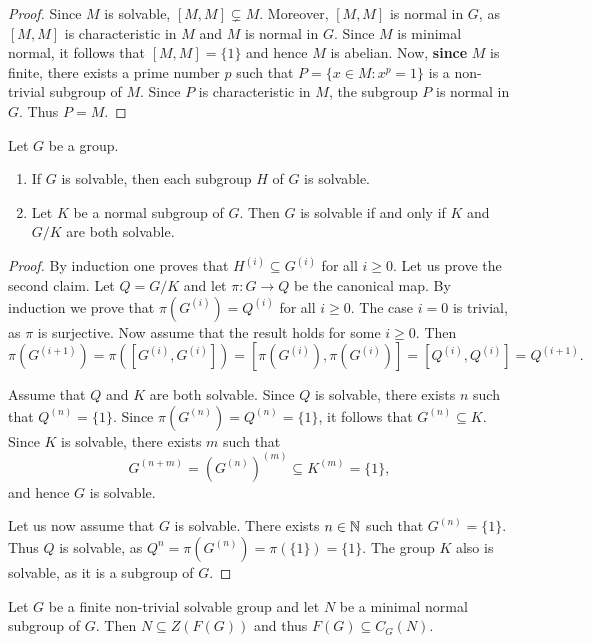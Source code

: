 \begin{proof}
	Since $M$ is solvable, $[M,M]\subsetneq M$. Moreover, $[M,M]$ is normal in $G$, as 
    $[M,M]$ is characteristic in $M$ and $M$ is normal in $G$. Since $M$ is minimal normal, 
    it follows that $[M,M]=\{1\}$ and hence $M$ is abelian. 
	Now, {\bf since} $M$ is finite, there exists a prime number $p$ such that 
	$P=\{x\in M:x^p=1\}$ is a non-trivial subgroup of $M$.  
	Since $P$ is characteristic in $M$, the subgroup
	$P$ is normal in $G$. Thus $P=M$. 
\end{proof}



\begin{theorem}
	\label{theorem:resoluble}
	Let $G$ be a group. 
	\begin{enumerate}
		\item  If $G$ is solvable, then each subgroup $H$ of $G$ is solvable. 
		\item Let $K$ be a normal subgroup of $G$. Then $G$ is solvable
			if and only if $K$ and $G/K$ are both solvable.
	\end{enumerate}
\end{theorem}

\begin{proof}
    By induction one proves that $H^{(i)}\subseteq G^{(i)}$ for all 
    $i\geq0$. Let us prove the second claim. Let $Q=G/K$ and let $\pi\colon G\to Q$ be the canonical map. 
    By induction we prove that $\pi(G^{(i)})=Q^{(i)}$ for all 
	$i\geq0$. The case $i=0$ is trivial, as $\pi$ is surjective. Now assume that
	the result holds for some $i\geq0$. Then 
	\[
		\pi(G^{(i+1)})=\pi([G^{(i)},G^{(i)}])=[\pi(G^{(i)}),\pi(G^{(i)})]=[Q^{(i)},Q^{(i)}]=Q^{(i+1)}.
	\]

	Assume that $Q$ and $K$ are both solvable. Since $Q$ is solvable, 
	there exists $n$ such that $Q^{(n)}=\{1\}$.
	Since $\pi(G^{(n)})=Q^{(n)}=\{1\}$, it follows that $G^{(n)}\subseteq K$. Since $K$
	is solvable, there exists $m$ such that 
	\[
		G^{(n+m)}= (G^{(n)})^{(m)}\subseteq K^{(m)}=\{1\},
	\]
	and hence $G$ is solvable.  

	Let us now assume that $G$ is solvable. There exists $n\in\mathbb{N}$ such that $G^{(n)}=\{1\}$.
	Thus $Q$ is solvable, as $Q^{n}=\pi (G^{(n)})=\pi(\{1\})=\{1\}$. The group $K$ also is 
	solvable, as it is a subgroup of $G$. 
\end{proof}

\begin{theorem}
	\label{theorem:F(G)centraliza}
	Let $G$ be a finite non-trivial solvable group and let $N$ be a minimal normal subgroup of $G$. Then
    $N\subseteq Z(F(G))$ and thus $F(G)\subseteq C_G(N)$.
\end{theorem}

